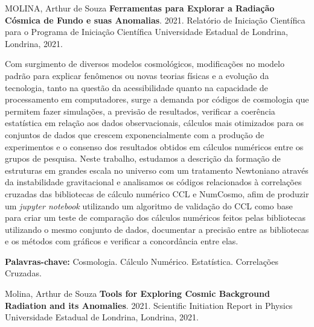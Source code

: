\documentclass[12pt,a4paper,oneside,brazil]{abntex2}
\theoremstyle{definition}
\numberwithin{defin}{section}
\numberwithin{thm}{section}
\numberwithin{notation}{section}
\theoremstyle{remark}
\numberwithin{exmp}{section}
\numberwithin{p}{section}
\numberwithin{lema}{section}
\begin{document}
	\begin{SingleSpace}
		\noindent MOLINA, Arthur de Souza \textbf{Ferramentas para Explorar a Radiação Cósmica de Fundo e suas Anomalias}.
		2021. Relatório de Iniciação Científica para o Programa de Iniciação Científica \textendash{}
		Universidade Estadual de Londrina, Londrina, 2021.
	\end{SingleSpace}
	
	\setlength{\absparsep}{18pt}
	
	\begin{resumo}
		
		Com surgimento de diversos modelos cosmológicos, modificações no modelo padrão para explicar fenômenos ou novas teorias físicas e a evolução da tecnologia, tanto na questão da acessibilidade quanto na capacidade de processamento em computadores, surge a demanda por códigos de cosmologia que permitem fazer simulações, a previsão de resultados, verificar a coerência estatística em relação aos dados observacionais, cálculos mais otimizados para os conjuntos de dados que crescem exponencialmente com a produção de experimentos e o consenso dos resultados obtidos em cálculos numéricos entre os grupos de pesquisa. Neste trabalho, estudamos a descrição da formação de estruturas em grandes escala no universo com um tratamento Newtoniano através da instabilidade gravitacional e analisamos os códigos relacionados à correlações cruzadas das bibliotecas de cálculo numérico CCL e NumCosmo, afim de produzir um \textit{jupyter notebook} utilizando um algoritmo de validação do CCL como base para criar um teste de comparação dos cálculos numéricos feitos pelas bibliotecas utilizando o mesmo conjunto de dados, documentar a precisão entre as bibliotecas e os métodos com gráficos e verificar a concordância entre elas.
		
		\textbf{Palavras-chave:} Cosmologia. Cálculo Numérico.
		 Estatística. Correlações Cruzadas.
	\end{resumo}
	

	
	\begin{SingleSpace}
		\noindent Molina, Arthur de Souza \textbf{Tools for Exploring Cosmic Background Radiation and its Anomalies}. 2021.
		Scientific Initiation Report in Physics \textendash{} Universidade
		Estadual de Londrina, Londrina, 2021.
	\end{SingleSpace}
	
	\setlength{\absparsep}{18pt}
	
\end{document}
